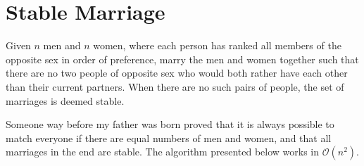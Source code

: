 
    \section{Stable Marriage}

    Given $n$ men and $n$ women, where each person has ranked all members of the opposite sex in order of preference, marry the men and women together such that there are no two people of opposite sex who would both rather have each other than their current partners. When there are no such pairs of people, the set of marriages is deemed stable.
    
    Someone way before my father was born proved that it is always possible to match everyone if there are equal numbers of men and women, and that all marriages in the end are stable. The algorithm presented below works in $\mathcal{O}(n^2)$.

